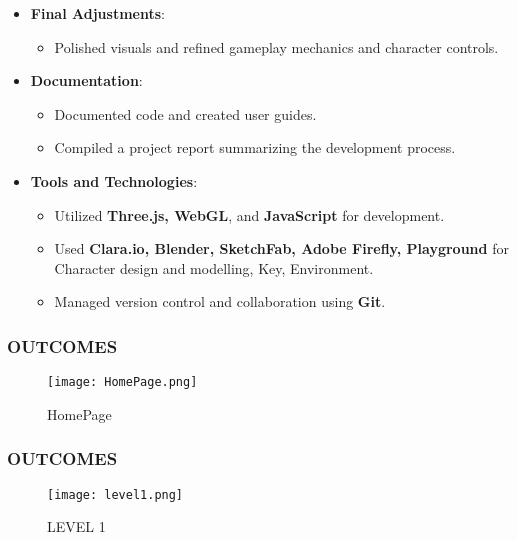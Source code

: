 \documentclass[9pt]{beamer}
\begin{document}
\begin{frame}
    \begin{itemize}
        \item \textbf{Final Adjustments}: 
        \begin{itemize}
            \item Polished visuals and refined gameplay mechanics and character controls.
        \end{itemize}
        \vspace{0.5em}

        \item \textbf{Documentation}: 
        \begin{itemize}
            \item Documented code and created user guides.
            \item Compiled a project report summarizing the development process.
        \end{itemize}
        
        \vspace{0.5em}

        \item \textbf{Tools and Technologies}: 
        \begin{itemize}
            \item Utilized \textbf{Three.js, WebGL}, and \textbf{JavaScript} for development.
            \item Used \textbf{Clara.io, Blender, SketchFab, Adobe Firefly, Playground} for Character design and modelling, Key, Environment.
            \item Managed version control and collaboration using \textbf{Git}.
        \end{itemize}
    \end{itemize}
\end{frame}



\begin{frame}
    \frametitle{OUTCOMES}
    \begin{figure}[h]
        \centering
        \texttt{[image: HomePage.png]}
        \caption{HomePage}
    \end{figure}
\end{frame}


\begin{frame}
    \frametitle{OUTCOMES}
    \begin{figure}[h]
        \centering
        \texttt{[image: level1.png]}
        \caption{LEVEL 1}
    \end{figure}
\end{frame}
\end{document}
